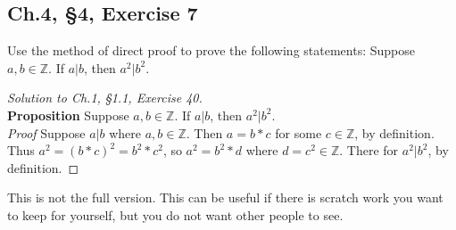 \documentclass[12pt]{amsart}
\numberwithin{equation}{section}
\theoremstyle{definition}
\theoremstyle{remark}
\newif\ifnotes
\begin{document}


\subsection*{Ch.4, \S 4,  Exercise 7} Use the method of direct proof to prove the following statements: Suppose $ a,b \in \mathbb{Z} $. If $ a | b $, then $ a^2 | b^2 $.


\begin{proof}[Solution to Ch.1, \S 1.1,  Exercise 40] \ \\
\textbf{Proposition} Suppose $ a,b \in \mathbb{Z} $. If $ a | b $, then $ a^2 | b^2 $.\ \\
\textit{Proof} Suppose $ a | b $ where $ a, b \in \mathbb{Z} $. Then $ a = b * c $ for some $ c \in \mathbb{Z} $, by definition. Thus $ a^2 = (b * c)^2 = b^2 * c^2 $, so $ a^2 = b^2 * d $ where $ d = c^2 \in \mathbb{Z} $. There for $ a^2|b^2 $, by definition.


\end{proof}



\newpage

\ifnotes


\else
	This is not the full version.  This can be useful if there is scratch work you want to keep for yourself, but you do not want other people to see. 
\fi





\end{document}
